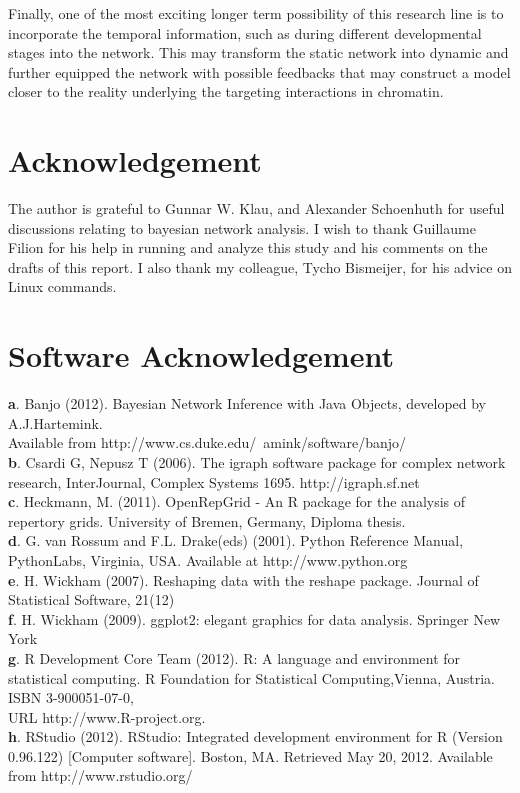 \documentclass{bioinfo}
\begin{document}
Finally, one of the most exciting longer term possibility of this research line is to incorporate the temporal information, such as during different developmental stages into the network. This may transform the static network into dynamic and further equipped the network with possible feedbacks that may construct a model closer to the reality underlying the targeting interactions in chromatin.

\section*{Acknowledgement}
The author is grateful to Gunnar W. Klau, and Alexander Schoenhuth for useful discussions relating to bayesian network analysis. I wish to thank Guillaume Filion for his help in running and analyze this study and his comments on the drafts of this report. I also thank my colleague, Tycho Bismeijer, for his advice on Linux commands.

\section*{Software Acknowledgement}

\textbf{a}. Banjo (2012). Bayesian Network Inference with Java Objects, developed by A.J.Hartemink.\\ 
Available from http://www.cs.duke.edu/~amink/software/banjo/\\
\textbf{b}. Csardi G, Nepusz T (2006). The igraph software package for complex network research, InterJournal, Complex Systems 1695. http://igraph.sf.net\\
\textbf{c}. Heckmann, M. (2011). OpenRepGrid - An R package for the analysis of repertory grids. University of Bremen, Germany, Diploma thesis.\\
\textbf{d}. G. van Rossum and F.L. Drake(eds) (2001). Python Reference Manual, PythonLabs, Virginia, USA. Available at http://www.python.org\\ 
\textbf{e}. H. Wickham (2007). Reshaping data with the reshape package. Journal of Statistical Software, 21(12)\\
\textbf{f}. H. Wickham (2009). ggplot2: elegant graphics for data analysis. Springer New York\\
\textbf{g}. R Development Core Team (2012). R: A language and environment for statistical computing. R Foundation for Statistical Computing,Vienna, Austria. ISBN 3-900051-07-0,\\ 
URL http://www.R-project.org.\\
\textbf{h}. RStudio (2012). RStudio: Integrated development environment for R (Version 0.96.122) [Computer software]. Boston, MA. Retrieved May 20, 2012.
Available from http://www.rstudio.org/\\
\end{document}
